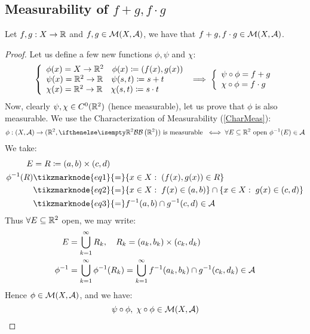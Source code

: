 \subsection{Measurability of \texorpdfstring{$f + g, f\cdot g$}{sum f and g, product f and g}} \label{meas:sumprod}
Let $f,g:X\to\mathbb{R}$ and $f,g\in\mathcal{M}(X,\mathcal{A})$, we have that $f+g, f\cdot g \in \mathcal{M}(X, \mathcal{A})$.

\begin{proof}
    Let us define a few new functions $\phi, \psi$ and $\chi$:
    \[
        \left\{ \begin{array}{l}
            \phi(x) = X\to\mathbb{R}^2 \quad \phi(x) \coloneqq \left( f(x), g(x) \right) \\
            \psi(x) = \mathbb{R}^2\to\mathbb{R} \quad \psi(s,t) \coloneqq s+t \\
            \chi(x) = \mathbb{R}^2\to\mathbb{R} \quad \chi(s,t) \coloneqq s\cdot t
        \end{array} \right. 
        \implies 
        \left\{ \begin{array}{l}
                \psi \circ \phi = f + g \\
                \chi \circ \phi = f \cdot g
        \end{array} \right.
    \]
    Now, clearly $\psi,\chi \in C^0(\mathbb{R}^2)$ (hence measurable), let us prove that $\phi $ is also measurable. We use the Characterization of Measurability (\ref{CharMeas}):
    \[
        \phi: (X,\A)\to (\R^2,\B[\R^2]) \text{ is measurable } \iff \forall E \subseteq \R^2 \text{ open } \phi^{-1}(E) \in \A
    \]
    We take:
    \begin{align*}
        E & = R \coloneqq (a,b) \times (c,d) \\
        \phi^{-1}(R) & \tikzmarknode{eq1}{=} \{ x\in X: \; (f(x),g(x))\in R \} \\
        & \tikzmarknode{eq2}{=} \{ x\in X: \; f(x)\in (a,b) \} \cap \{ x\in X: \; g(x)\in (c,d) \} \\
        & \tikzmarknode{eq3}{=} f^{-1}(a,b) \cap g^{-1}(c,d) \in \A
    \end{align*} 
    Thus $\forall E \subseteq \mathbb{R}^2$ open, we may write:
    \begin{align*}
        E & = \bigcup_{k=1}^\infty R_k, \quad R_k = (a_k,b_k) \times (c_k,d_k) \\
        \phi^{-1} & = \bigcup_{k=1}^\infty \phi^{-1}(R_k) = \bigcup_{k=1}^\infty f^{-1}(a_k,b_k) \cap g^{-1}(c_k,d_k) \in \mathcal{A}
    \end{align*}
    Hence $\phi \in \mathcal{M}(X,\mathcal{A})$, and we have:
    \[
        \psi \circ \phi, \; \chi \circ \phi \in \mathcal{M}(X,\mathcal{A})    
    \]
\end{proof}

